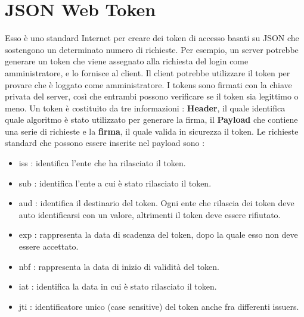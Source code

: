 \documentclass[12pt]{report}
\begin{document}
\section{JSON Web Token}
Esso è uno standard Internet per creare dei token di accesso basati su JSON che sostengono un determinato numero di richieste. Per esempio, un server potrebbe generare un token che viene assegnato alla richiesta del login come amministratore, e lo fornisce al client. Il client potrebbe utilizzare il token per provare che è loggato come amministratore. I tokens sono firmati con la chiave privata del server, così che entrambi possono verificare se il token sia legittimo o meno. Un token è costituito da tre informazioni : \textbf{Header}, il quale identifica quale algoritmo è stato utilizzato per generare la firma, il \textbf{Payload} che contiene una serie di richieste e la \textbf{firma}, il quale valida in sicurezza il token. Le richieste standard che possono essere inserite nel payload sono :
\begin{itemize}
\item iss : identifica l'ente che ha rilasciato il token.
\item sub : identifica l'ente a cui è stato rilasciato il token.
\item aud : identifica il destinario del token. Ogni ente che rilascia dei token deve auto identificarsi con un valore, altrimenti il token deve essere rifiutato.
\item exp : rappresenta la data di scadenza del token, dopo la quale esso non deve essere accettato.
\item nbf : rappresenta la data di inizio di validità del token.
\item iat : identifica la data in cui è stato rilasciato il token.
\item jti : identificatore unico (case sensitive) del token anche fra differenti issuers.
\end{itemize}
\end{document}
